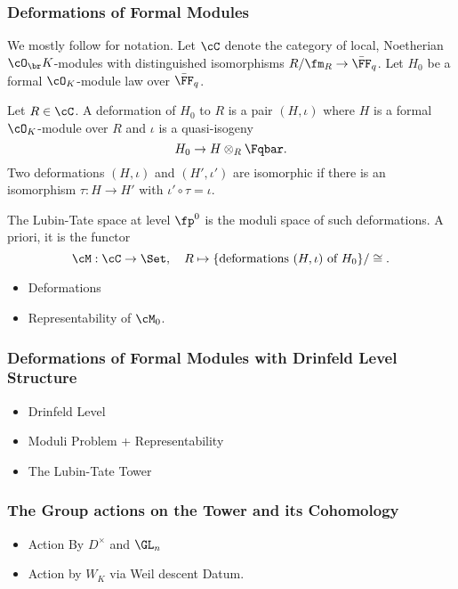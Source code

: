\subsubsection{Deformations of Formal Modules} %
\label{subsub:Deformations of Formal Modules}
We mostly follow \cite[Chapter 2]{Strauch2008DefSp} for notation. Let $\cC$
denote the category of local, Noetherian $\cO_\br K$-modules with distinguished
isomorphisms $R/\fm_R \to \bar \FF_q$. Let $H_0$ be a formal $\cO_K$-module law
over $\bar \FF_q$. 
\begin{defi}[Deformation]
  Let $R \in \cC$. A deformation of $H_0$ to $R$ is a pair $(H, \iota)$ where
  $H$ is a formal $\cO_K$-module over $R$ and $\iota$ is a quasi-isogeny
  \begin{equation*}
    H_0 \to H \otimes_R \Fqbar.
  \end{equation*}
  Two deformations $(H, \iota)$ and $(H', \iota')$ are isomorphic if there is
  an isomorphism $\tau: H \to H'$ with $\iota' \circ \tau = \iota$. 
\end{defi}
The Lubin-Tate space at level $\fp^0$ is the moduli space of such deformations.
A priori, it is the functor
\begin{equation*}
  \cM: \cC \to \Set, \quad R \mapsto \{\text{deformations } (H, \iota) \text{
  of $H_0$}\}/\cong.
\end{equation*}



\begin{itemize}
  \item Deformations
  \item Representability of $\cM_0$.
\end{itemize}

\subsubsection{Deformations of Formal Modules with Drinfeld Level Structure} %
\label{subsub:Deformations of Formal Modules with Drinfeld Level Structure}
\begin{itemize}
  \item Drinfeld Level
  \item Moduli Problem + Representability
  \item The Lubin-Tate Tower
\end{itemize}

\subsubsection{The Group actions on the Tower and its Cohomology} %
\label{subsub:The Group actions on the Tower}
\begin{itemize}
  \item Action By $D^\times$ and $\GL_n$
  \item Action by $W_K$ via Weil descent Datum.
\end{itemize}
